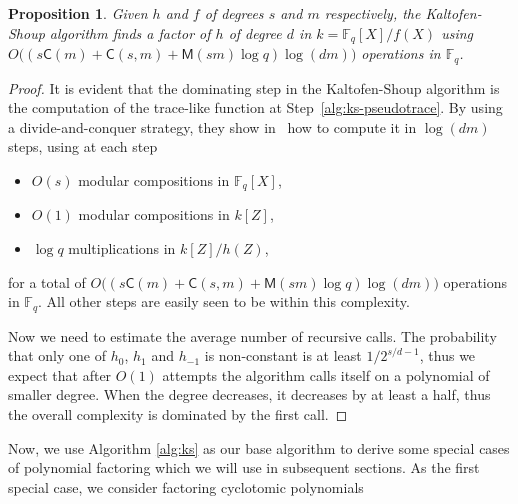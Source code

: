 \documentclass[12pt]{article}
\theoremstyle{plain}
\newtheorem{proposition}[theorem]{Proposition}
\theoremstyle{definition}
\def\F{\ensuremath{\mathbb{F}}}
\def\MM{\ensuremath{\mathsf{M}}}
\def\CC{\ensuremath{\mathsf{C}}}
\newcounter{algorithm}
\begin{document}
\begin{proposition}
  Given $h$ and $f$ of degrees $s$ and $m$ respectively, the
  Kaltofen-Shoup algorithm finds a factor of $h$ of degree $d$ in
  $k=\F_q[X]/f(X)$ using
  $O\bigl((s\CC(m) + \CC(s,m) + \MM(sm)\log q)\log(dm)\bigr)$
  operations in $\F_q$.
\end{proposition}
\begin{proof}
	It is evident that the dominating step in the Kaltofen-Shoup
	algorithm is the computation of the trace-like function at
	Step~\ref{alg:ks-pseudotrace}. By using a divide-and-conquer
	strategy, they show in~\cite{kaltofen+shoup97} how to compute it in
	$\log (dm)$ steps, using at each step
	\begin{itemize}
		\item $O(s)$ modular compositions in $\F_q[X]$,
		\item $O(1)$ modular compositions in $k[Z]$,
		\item $\log q$ multiplications in $k[Z]/h(Z)$,
	\end{itemize}
	for a total of
        $O\bigl((s\CC(m) + \CC(s,m) + \MM(sm)\log q)\log(dm)\bigr)$
        operations in $\F_q$.  All other steps are easily seen to be
        within this complexity.
	
	Now we need to estimate the average number of recursive calls. The
	probability that only one of $h_0$, $h_1$ and $h_{-1}$ is
	non-constant is at least $1/2^{s/d-1}$, thus we expect that after
	$O(1)$ attempts the algorithm calls itself on a polynomial of
	smaller degree. When the degree decreases, it decreases by at least
	a half, thus the overall complexity is dominated by the first call.
\end{proof}

Now, we use Algorithm \ref{alg:ks} as our base algorithm to derive some
special cases of polynomial factoring which we will use in subsequent sections.
As the first special case, we consider factoring cyclotomic polynomials
\end{document}
